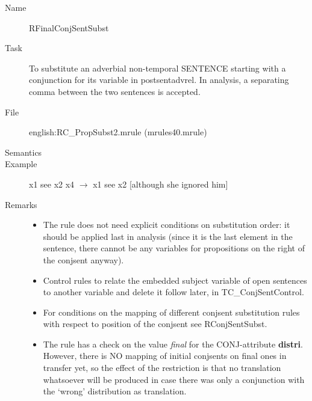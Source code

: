 \begin{description}
\vspace{1 cm}
\begin{description}
\item[Name] RFinalConjSentSubst
\item[Task] To substitute an adverbial non-temporal SENTENCE starting with a 
conjunction for its variable in 
postsentadvrel. In analysis, a separating comma between the two sentences is 
accepted.
\item[File] english:RC\_PropSubst2.mrule (mrules40.mrule)
\item[Semantics]
\item[Example]  x1 see x2 x4 $\rightarrow$ x1 see x2 [although she ignored him]
\item[Remarks] \mbox{}
\begin{itemize}
\item The rule does not need explicit conditions on substitution order: it 
should be applied last in analysis (since it is the last element in the 
sentence, there cannot be any variables for propositions on 
the right of the conjsent anyway). 
\item Control rules to relate the embedded subject variable of open sentences 
to another variable and delete it follow later, in TC\_ConjSentControl.
\item For conditions on the mapping of different conjsent substitution rules 
with respect to position of the conjsent see RConjSentSubst.
\item The rule has a check on the value {\em final\/} for the CONJ-attribute 
{\bf distri}. However, 
there is NO mapping of initial conjsents on final ones in transfer yet, so the
effect of the restriction is that no translation whatsoever will be produced in 
case there was only a conjunction with the `wrong' distribution as translation.
\end{itemize}
\end{description}


\end{description}
